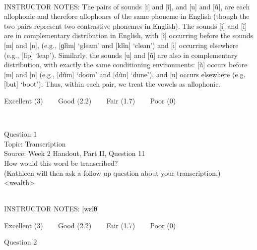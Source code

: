 \documentclass[12pt]{article}
\begin{document}
~\\
INSTRUCTOR NOTES: The pairs of sounds [i] and [ĩ], and [u] and [ũ], are each allophonic and therefore allophones of the same phoneme in English (though the two pairs represent two contrastive phonemes in English). The sounds [i] and [ĩ] are in complementary distribution in English, with [ĩ] occurring before the sounds [m] and [n], (e.g., [ɡlĩm] ‘gleam’ and [klĩn] ‘clean’) and [i] occurring elsewhere (e.g., [lip] ‘leap’). Similarly, the sounds [u] and [ũ] are also in complementary distribution, with exactly the same conditioning environments: [ũ] occurs before [m] and [n] (e.g., [dũm] ‘doom’ and [dũn] ‘dune’), and [u] occurs elsewhere (e.g. [but] ‘boot’). Thus, within each pair, we treat the vowels as allophonic. 


\vfill
Excellent (3) ~~~ Good (2.2) ~~~ Fair (1.7) ~~~ Poor (0)
\newpage

\begin{center}
\textbf{{\color{red}{\HUGE END OF EXAM}}}\\

\end{center}
\newpage

\begin{center}
\textbf{{\color{blue}{\HUGE START OF EXAM\\}}}

\textbf{{\color{blue}{\HUGE Student ID: 90811\\}}}

\textbf{{\color{blue}{\HUGE \\}}}

\end{center}
\newpage

{\large Question 1}\\

Topic: Transcription\\
Source: Week 2 Handout, Part II, Question 11\\

How would this word be transcribed?\\ (Kathleen will then ask a follow-up question about your transcription.)\\

<wealth>


~\\
INSTRUCTOR NOTES: [wɛlθ]


\vfill
Excellent (3) ~~~ Good (2.2) ~~~ Fair (1.7) ~~~ Poor (0)
\newpage

{\large Question 2}\\
\end{document}
